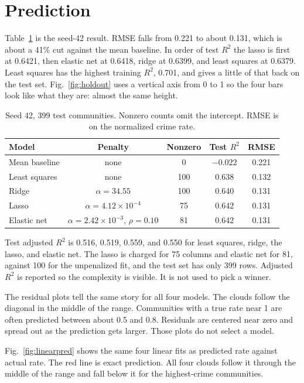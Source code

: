 \documentclass[conference]{IEEEtran}
\begin{document}
\section{Prediction}
Table~\ref{tab:primary} is the seed-42 result.
RMSE falls from 0.221 to about 0.131, which is about a 41\% cut against the mean baseline.
In order of test $R^{2}$ the lasso is first at 0.6421, then elastic net at 0.6418, ridge at 0.6399, and least squares at 0.6379.
Least squares has the highest training $R^{2}$, 0.701, and gives a little of that back on the test set.
Fig.~\ref{fig:holdout} uses a vertical axis from 0 to 1 so the four bars look like what they are: almost the same height.

\begin{table}[t]
\caption{Seed 42, 399 test communities. Nonzero counts omit the intercept. RMSE is on the normalized crime rate.}
\label{tab:primary}
\centering
\scriptsize
\begin{tabular}{@{}lcccc@{}}
\toprule
Model & Penalty & Nonzero & Test $R^{2}$ & RMSE \\
\midrule
Mean baseline & none & 0 & $-0.022$ & 0.221 \\
Least squares & none & 100 & 0.638 & 0.132 \\
Ridge & $\alpha=34.55$ & 100 & 0.640 & 0.131 \\
Lasso & $\alpha=4.12\times 10^{-4}$ & 75 & 0.642 & 0.131 \\
Elastic net & $\alpha=2.42\times 10^{-3}$, $\rho=0.10$ & 81 & 0.642 & 0.131 \\
\bottomrule
\end{tabular}
\end{table}

Test adjusted $R^{2}$ is 0.516, 0.519, 0.559, and 0.550 for least squares, ridge, the lasso, and elastic net.
The lasso is charged for 75 columns and elastic net for 81, against 100 for the unpenalized fit, and the test set has only 399 rows.
Adjusted $R^{2}$ is reported so the complexity is visible.
It is not used to pick a winner.

The residual plots tell the same story for all four models.
The clouds follow the diagonal in the middle of the range.
Communities with a true rate near 1 are often predicted between about 0.5 and 0.8.
Residuals are centered near zero and spread out as the prediction gets larger.
Those plots do not select a model.

Fig.~\ref{fig:linearpred} shows the same four linear fits as predicted rate against actual rate.
The red line is exact prediction.
All four clouds follow it through the middle of the range and fall below it for the highest-crime communities.
\end{document}
